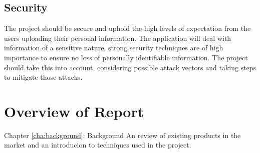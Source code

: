 \subsection{Security}
The project should be secure and uphold the high levels of expectation from the users uploading their personal information.
%
The application will deal with information of a sensitive nature, strong security techniques are of high importance to ensure no loss of personally identifiable information. 
% 
The project should take this into account, considering possible attack vectors and taking steps to mitigate those attacks.

\section{Overview of Report}

Chapter \ref{cha:background}: Background 
An review of existing products in the market and an introducion to techniques used in the project.

